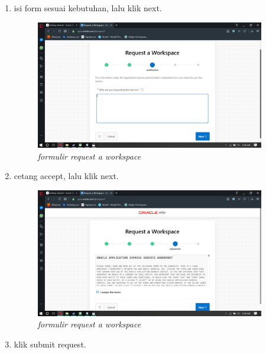 \documentclass[12pt]{ociamthesis}  %
\begin{document}
\begin{enumerate}
	
	\item isi form sesuai kebutuhan, lalu klik next.	
	
	\begin{figure}[H]
    \centering
    \includegraphics[width=10cm]{figures/gambar/Screenshot (110).png}  
    \caption{\textit{formulir request a workspace}}
    \label{foto4}
 	\end{figure}
	
	\item cetang accept, lalu klik next.
	
	\begin{figure}[H]
    \centering
    \includegraphics[width=10cm]{figures/gambar/Screenshot (111).png}  
    \caption{\textit{formulir request a workspace}}
    \label{foto5}
 	\end{figure}
 	
	\item klik submit request.
	

\end{enumerate}
\end{document}
